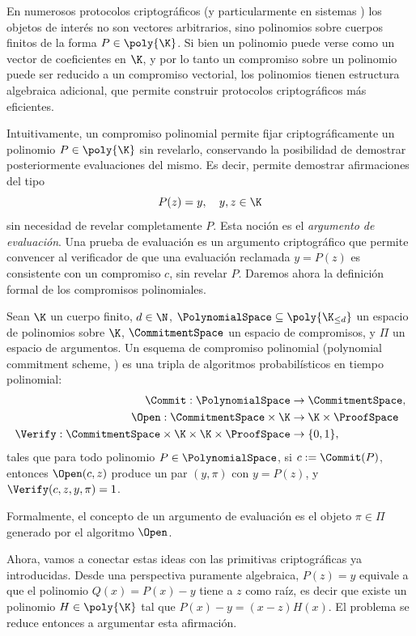 En numerosos protocolos criptográficos (y particularmente en sistemas \SNARK) los objetos de interés no son vectores arbitrarios, sino polinomios sobre cuerpos finitos de la forma $P \in \poly{\K}$. Si bien un polinomio puede verse como un vector de coeficientes en $\K$, y por lo tanto un compromiso sobre un polinomio puede ser reducido a un compromiso vectorial, los polinomios tienen estructura algebraica adicional, que permite construir protocolos criptográficos más eficientes.

Intuitivamente, un compromiso polinomial permite fijar criptográficamente un polinomio $P \in \poly{\K}$ sin revelarlo, conservando la posibilidad de demostrar posteriormente evaluaciones del mismo. Es decir, permite demostrar afirmaciones del tipo
$$P(z) = y, \quad y,z \in \K$$
sin necesidad de revelar completamente $P$. Esta noción es el \emph{argumento de evaluación}. Una prueba de evaluación es un argumento criptográfico que permite convencer al verificador de que una evaluación reclamada $y = P(z)$ es consistente con un compromiso $c$, sin revelar $P$. Daremos ahora la definición formal de los compromisos polinomiales.

\begin{definition}[\PCS]
	Sean $\K$ un cuerpo finito, $d \in \N$, $\PolynomialSpace \subseteq \poly{\K_{\leq d}}$ un espacio de polinomios sobre $\K$, $\CommitmentSpace$ un espacio de compromisos, y $\Pi$ un espacio de argumentos. Un esquema de compromiso polinomial (polynomial commitment scheme, \PCS) es una tripla de algoritmos probabilísticos en tiempo polinomial:
	$$
	\begin{aligned}
		\Commit: \PolynomialSpace &\to \CommitmentSpace, \\
		\Open: \CommitmentSpace \times \K &\to \K \times \ProofSpace \\
		\Verify: \CommitmentSpace \times \K \times \K \times \ProofSpace &\to \{0,1\},
	\end{aligned}
	$$
	tales que para todo polinomio $P \in \PolynomialSpace$, si $c := \Commit(P)$, entonces
	$\Open(c, z)$ produce un par $(y, \pi)$ con $y = P(z)$, y $\Verify(c, z, y, \pi) = 1$.
\end{definition}

Formalmente, el concepto de un argumento de evaluación es el objeto $\pi \in \Pi$ generado por el algoritmo $\Open$.

Ahora, vamos a conectar estas ideas con las primitivas criptográficas ya introducidas. Desde una perspectiva puramente algebraica, $P(z) = y$ equivale a que el polinomio $Q(x) = P(x) - y$ tiene a $z$ como raíz, es decir que existe un polinomio $H \in \poly{\K}$ tal que $P(x) - y = (x - z)H(x)$. El problema se reduce entonces a argumentar esta afirmación.

